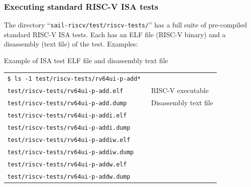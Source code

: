 \documentclass[aspectratio=169]{beamer}
\newcommand{\hmm}{\hspace*{2em}}
\newcommand{\slidefont}{\scriptsize}
\begin{document}

\begin{frame}[fragile]
  \frametitle{Executing standard RISC-V ISA tests}

  \slidefont

  The directory ``{\tt sail-riscv/test/riscv-tests/}'' has a full
  suite of pre-compiled standard RISC-V ISA tests.  Each has an ELF
  file (RISC-V binary) and a disassembly (text file) of the test.
  Examples:

  \begin{block}{Example of ISA test ELF file and disassembly text file}
    \slidefont
    \begin{tabular}{ll}
      \tt \$ ls -1 test/riscv-tests/rv64ui-p-add* \hmm & \\
      \tt test/riscv-tests/rv64ui-p-add.elf            & RISC-V executable \\
      \tt test/riscv-tests/rv64ui-p-add.dump           & Disassembly text file \\
      \tt test/riscv-tests/rv64ui-p-addi.elf           & \\
      \tt test/riscv-tests/rv64ui-p-addi.dump          & \\
      \tt test/riscv-tests/rv64ui-p-addiw.elf          & \\
      \tt test/riscv-tests/rv64ui-p-addiw.dump         & \\
      \tt test/riscv-tests/rv64ui-p-addw.elf           & \\
      \tt test/riscv-tests/rv64ui-p-addw.dump          &
    \end{tabular}
  \end{block}

\end{frame}

\end{document}
